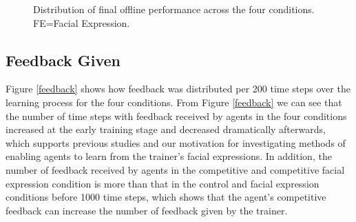 \documentclass[10pt,journal,compsoc]{IEEEtran}
\begin{document}
\begin{figure}[htb]
\begin{tabular}{c c c c}
\end{tabular}
\caption{Distribution of final offline performance across the four conditions. FE=Facial Expression.}%
\label{HisFinalOfflinePerformance}
\end{figure}

\subsection{Feedback Given}

Figure \ref{feedback} shows how feedback was distributed per 200 time steps over the learning process for the four conditions. From Figure \ref{feedback} we can see that the number of time steps with feedback received by agents in the four conditions increased at the early training stage and decreased dramatically afterwards, which supports previous studies \cite{knox2012humans,li2013using} and our motivation for investigating methods of enabling agents to learn from the trainer's facial expressions. In addition, the number of feedback received by agents in the competitive and competitive facial expression condition is more than that in the control and facial expression conditions before 1000 time steps, which shows that the agent's competitive feedback can increase the number of feedback given by the trainer. %


\end{document}
